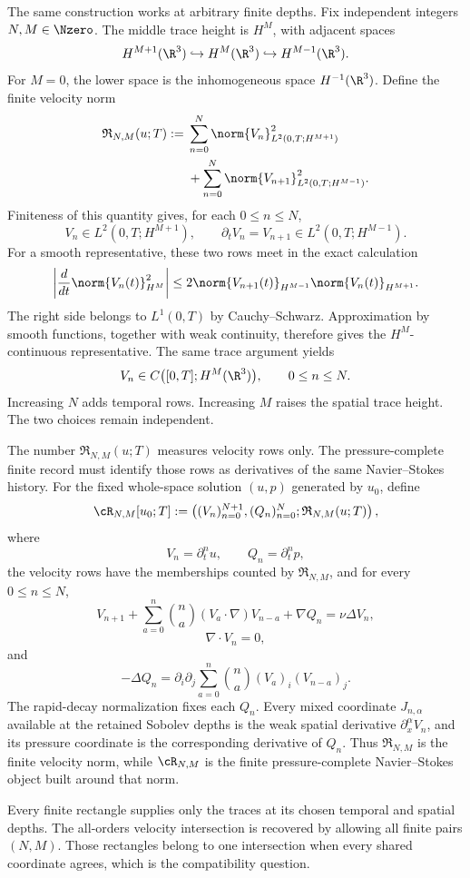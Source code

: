 The same construction works at arbitrary finite depths.
Fix independent integers \(N,M\in\Nzero\).
The middle trace height is \(H^M\), with adjacent spaces
\[
  H^{M+1}(\R^3)
  \hookrightarrow
  H^M(\R^3)
  \hookrightarrow
  H^{M-1}(\R^3).
\]
For \(M=0\), the lower space is the inhomogeneous space \(H^{-1}(\R^3)\).
Define the finite velocity norm
\begin{align*}
  \mathfrak R_{N,M}(u;T)
  :={}&
  \sum_{n=0}^{N}
  \norm{V_n}_{L^2(0,T;H^{M+1})}^{2}
  \\
  &+
  \sum_{n=0}^{N}
  \norm{V_{n+1}}_{L^2(0,T;H^{M-1})}^{2}.
\end{align*}
Finiteness of this quantity gives, for each \(0\leq n\leq N\),
\[
  V_n\in L^2(0,T;H^{M+1}),
  \qquad
  \partial_tV_n=V_{n+1}\in L^2(0,T;H^{M-1}).
\]
For a smooth representative, these two rows meet in the exact calculation
\[
  \left|
    \frac{d}{dt}
    \norm{V_n(t)}_{H^M}^{2}
  \right|
  \leq
  2
  \norm{V_{n+1}(t)}_{H^{M-1}}
  \norm{V_n(t)}_{H^{M+1}}.
\]
The right side belongs to \(L^1(0,T)\) by Cauchy--Schwarz.
Approximation by smooth functions, together with weak continuity, therefore gives the \(H^M\)-continuous representative.
The same trace argument yields
\[
  V_n
  \in
  C\bigl([0,T];H^M(\R^3)\bigr),
  \qquad
  0\leq n\leq N.
\]
Increasing \(N\) adds temporal rows.
Increasing \(M\) raises the spatial trace height.
The two choices remain independent.

The number \(\mathfrak R_{N,M}(u;T)\) measures velocity rows only.
The pressure-complete finite record must identify those rows as derivatives of the same Navier--Stokes history.
For the fixed whole-space solution \((u,p)\) generated by \(u_0\), define
\[
  \cR_{N,M}[u_0;T]
  :=
  \left(
    (V_n)_{n=0}^{N+1},
    (Q_n)_{n=0}^{N};
    \mathfrak R_{N,M}(u;T)
  \right),
\]
where
\[
  V_n=\partial_t^nu,
  \qquad
  Q_n=\partial_t^np,
\]
the velocity rows have the memberships counted by \(\mathfrak R_{N,M}\), and for every \(0\leq n\leq N\),
\[
  V_{n+1}
  +
  \sum_{a=0}^{n}
  \binom{n}{a}
  (V_a\cdot\nabla)V_{n-a}
  +\nabla Q_n
  =
  \nu\Delta V_n,
\]
\[
  \nabla\cdot V_n=0,
\]
and
\[
  -\Delta Q_n
  =
  \partial_i\partial_j
  \sum_{a=0}^{n}
  \binom{n}{a}
  (V_a)_i(V_{n-a})_j.
\]
The rapid-decay normalization fixes each \(Q_n\).
Every mixed coordinate \(J_{n,\alpha}\) available at the retained Sobolev depths is the weak spatial derivative \(\partial_x^\alpha V_n\), and its pressure coordinate is the corresponding derivative of \(Q_n\).
Thus \(\mathfrak R_{N,M}\) is the finite velocity norm, while \(\cR_{N,M}\) is the finite pressure-complete Navier--Stokes object built around that norm.

Every finite rectangle supplies only the traces at its chosen temporal and spatial depths.
The all-orders velocity intersection is recovered by allowing all finite pairs \((N,M)\).
Those rectangles belong to one intersection when every shared coordinate agrees, which is the compatibility question.
